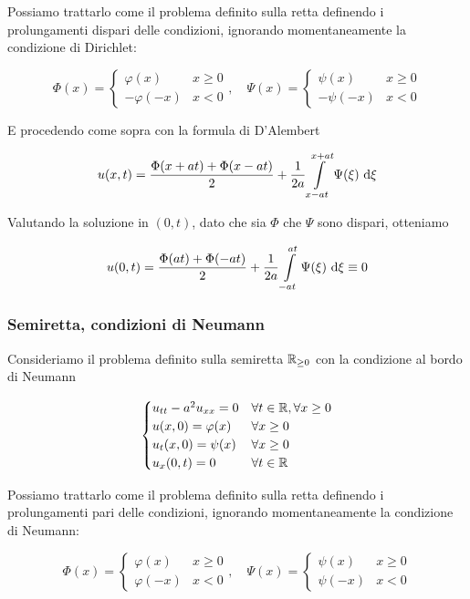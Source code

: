 \documentclass{article}
\begin{document}
Possiamo trattarlo come il problema definito sulla retta definendo i prolungamenti dispari delle condizioni, ignorando momentaneamente la condizione di Dirichlet:

\[ \Phi(x) = \begin{cases} \varphi(x) & x\ge 0 \\ -\varphi(-x) & x<0\end{cases}, \quad \Psi(x) = \begin{cases}\psi(x) & x\ge 0 \\ -\psi(-x) & x<0\end{cases}\]

E procedendo come sopra con la formula di D'Alembert 

\[u(x,t) = \frac{\Phi(x+at) + \Phi(x-at) }{2} + \frac{1}{2a} \intop_{x-at}^{x+at} \Psi(\xi)\de \xi \]

Valutando la soluzione in $(0,t)$, dato che sia $\Phi$ che $\Psi$ sono dispari, otteniamo

\[ u(0,t) = \frac{\Phi(at) + \Phi(-at) }{2} + \frac{1}{2a} \intop_{-at}^{at} \Psi(\xi)\de \xi \equiv 0 \]

\subsubsection{Semiretta, condizioni di Neumann}

Consideriamo il problema definito sulla semiretta $\mathbb{R}_{\ge 0}$ con la condizione al bordo di Neumann

\[ \begin{cases}
    u_{tt} - a^2 u_{xx} = 0 & \forall t \in \mathbb{R}, \forall x \ge 0\\
    u(x,0) = \varphi(x) & \forall x \ge 0\\
    u_t(x,0) = \psi(x) & \forall x \ge 0\\
    u_x(0,t) = 0 & \forall t \in \mathbb{R}
\end{cases} \]

Possiamo trattarlo come il problema definito sulla retta definendo i prolungamenti pari delle condizioni, ignorando momentaneamente la condizione di Neumann:

\[ \Phi(x) = \begin{cases} \varphi(x) & x\ge 0 \\ \varphi(-x) & x<0\end{cases}, \quad \Psi(x) = \begin{cases}\psi(x) & x\ge 0 \\ \psi(-x) & x<0\end{cases}\]
\end{document}
